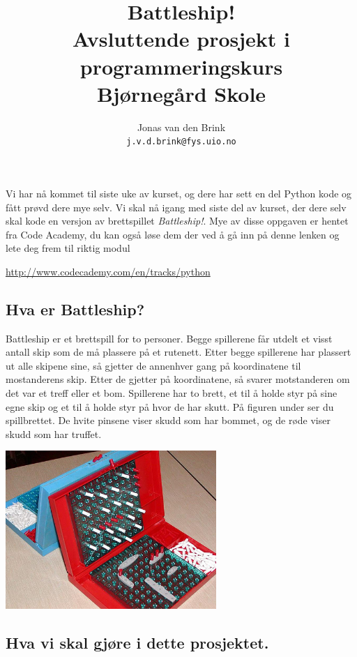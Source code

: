 \documentclass[a4paper, 11pt, notitlepage]{article}
\author{Jonas van den Brink \\[-0.2cm] \texttt{j.v.d.brink@fys.uio.no}}
\title{Battleship! \\ Avsluttende prosjekt i programmeringskurs \\ Bjørnegård Skole}
\begin{document}
\maketitle

\thispagestyle{empty}

Vi har nå kommet til siste uke av kurset, og dere har sett en del Python kode og fått prøvd dere mye selv. Vi skal nå igang med siste del av kurset, der dere selv skal kode en versjon av brettspillet \emph{Battleship!}. Mye av disse oppgaven er hentet fra Code Academy, du kan også løse dem der ved å gå inn på denne lenken og lete deg frem til riktig modul

\begin{center}
\url{http://www.codecademy.com/en/tracks/python}
\end{center}

\subsection*{Hva er Battleship?}

Battleship er et brettspill for to personer. Begge spillerene får utdelt et visst antall skip som de må plassere på et rutenett. Etter begge spillerene har plassert ut alle skipene sine, så gjetter de annenhver gang på koordinatene til mostanderens skip. Etter de gjetter på koordinatene, så svarer motstanderen om det var et treff eller et bom. Spillerene har to brett, et til å holde styr på sine egne skip og et til å holde styr på hvor de har skutt. På figuren under ser du spillbrettet. De hvite pinsene viser skudd som har bommet, og de røde viser skudd som har truffet.

\begin{center}
\includegraphics[width=0.6\textwidth]{battleship-board-game}
\end{center}

\subsection*{Hva vi skal gjøre i dette prosjektet.}
\end{document}
